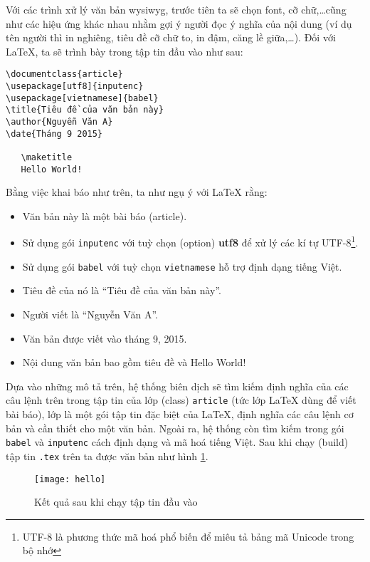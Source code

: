 Với các trình xử lý văn bản \acrshort{wysiwyg}, trước tiên ta sẽ chọn font, cỡ chữ,\dots cũng như
các hiệu ứng khác nhau nhằm gợi ý người đọc ý nghĩa của nội dung (ví dụ tên người thì in nghiêng,
tiêu đề cỡ chữ to, in đậm, căng lề giữa,\dots). Đối với LaTeX, ta sẽ trình bày trong tập tin đầu vào như sau:\par
\clearpage
\begin{verbatim}
\documentclass{article}
\usepackage[utf8]{inputenc}
\usepackage[vietnamese]{babel}
\title{Tiêu đề của văn bản này}
\author{Nguyễn Văn A}
\date{Tháng 9 2015}

   \maketitle
   Hello World!

\end{verbatim}

Bằng việc khai báo như trên, ta như ngụ ý với LaTeX rằng:\par
\begin{itemize}
 \item Văn bản này là một bài báo (article).
 \item Sử dụng gói \verb=inputenc= với tuỳ chọn (option) \textbf{utf8} để xử lý các kí tự UTF-8\footnote{UTF-8 là phương thức mã hoá phổ biến để miêu tả bảng mã Unicode trong bộ nhớ}.
 \item Sử dụng gói \verb=babel= với tuỳ chọn \verb=vietnamese= hỗ trợ định dạng tiếng Việt.
 \item Tiêu đề của nó là “Tiêu đề của văn bản này”.
 \item Người viết là “Nguyễn Văn A”.
 \item Văn bản được viết vào tháng 9, 2015.
 \item Nội dung văn bản bao gồm tiêu đề và Hello World!
\end{itemize}

Dựa vào những mô tả trên, hệ thống biên dịch sẽ tìm kiếm định nghĩa của các câu lệnh trên trong
tập tin của lớp (class) \texttt{article} (tức lớp LaTeX dùng để viết bài báo), lớp là một gói tập tin đặc biệt của LaTeX, định nghĩa các câu lệnh cơ bản
và cần thiết cho một văn bản. Ngoài ra, hệ thống còn tìm kiếm trong gói \verb=babel= và \verb=inputenc=
cách định dạng và mã hoá tiếng Việt. Sau khi chạy (build) tập tin \verb=.tex= trên ta được văn bản như hình
\ref{fig:hello}.\par

\begin{figure}[ht]
 \centering
 \texttt{[image: hello]}
 \caption{Kết quả sau khi chạy tập tin đầu vào}
 \label{fig:hello}
\end{figure}

